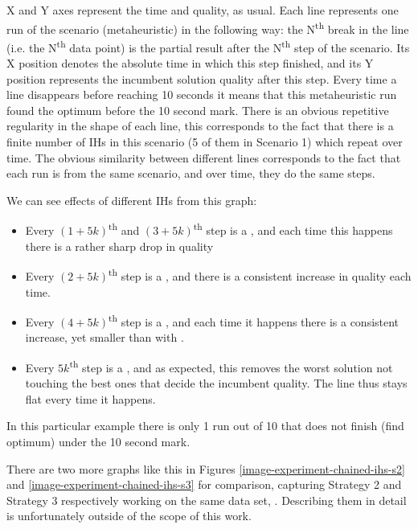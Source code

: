 X and Y axes represent the time and quality, as usual. Each line represents one run of the scenario (metaheuristic) in the following way: the N\textsuperscript{th} break in the line (i.e. the N\textsuperscript{th} data point) is the partial result after the N\textsuperscript{th} step of the scenario. Its X position denotes the absolute time in which this step finished, and its Y position represents the incumbent solution quality after this step. Every time a line disappears before reaching 10 seconds it means that this metaheuristic run found the optimum before the 10 second mark. There is an obvious repetitive regularity in the shape of each line, this corresponds to the fact that there is a finite number of IHs in this scenario (5 of them in Scenario 1) which repeat over time. The obvious similarity between different lines corresponds to the fact that each run is from the same scenario, and over time, they do the same steps. 

We can see effects of different IHs from this graph:
\begin{itemize}
	\item Every $(1 + 5k)$\textsuperscript{th} and $(3 + 5k)$\textsuperscript{th} step is a , and each time this happens there is a rather sharp drop in quality
	\item Every $(2 + 5k)$\textsuperscript{th} step is a , and there is a consistent increase in quality each time.
	\item Every $(4 + 5k)$\textsuperscript{th} step is a , and each time it happens there is a consistent increase, yet smaller than with .
	\item Every $5k$\textsuperscript{th} step is a , and as expected, this removes the worst solution not touching the best ones that decide the incumbent quality. The line thus stays flat every time it happens.
\end{itemize}

In this particular example there is only 1 run out of 10 that does not finish (find optimum) under the 10 second mark. 

There are two more graphs like this in Figures \ref{image-experiment-chained-ihs-s2} and \ref{image-experiment-chained-ihs-s3} for comparison, capturing Strategy 2 and Strategy 3 respectively working on the same data set, . Describing them in detail is unfortunately outside of the scope of this work.

